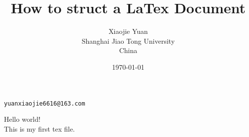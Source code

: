 \documentclass[11pt,a4paper,oneside]{report}
\begin{document}
	\title{How to struct a LaTex Document}
	\author{Xiaojie Yuan\\ Shanghai Jiao Tong University\\ China}
	\texttt{yuanxiaojie6616@163.com}
	\date{\today}
	\maketitle
		Hello world!\\
		This is my first tex file.\\
	
\end{document}

